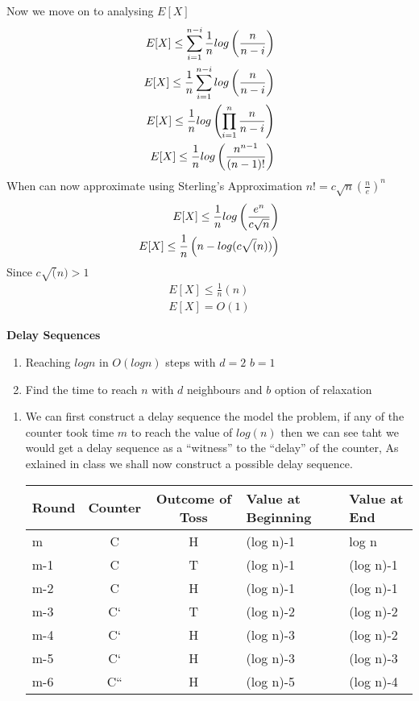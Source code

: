 \documentclass{assignment}
\begin{document}
\begin{problemlist}
\begin{problem}
\begin{answer}
Now we move on to analysing $E[X]$
\begin{eqnarray}
E[X] \leq \sum_{i=1}^{n-i} \frac{1}{n} log \left( {n \over n-i} \right)\\
E[X] \leq \frac{1}{n} \sum_{i=1}^{n-i} log \left( {n \over n-i} \right) \\
E[X] \leq \frac{1}{n} log  \left( \prod_{i=1}^{n} {n \over n-i} \right) \\
E[X] \leq \frac{1}{n} log  \left(  {n^{n-1} \over (n-1)!} \right) 
\end{eqnarray}
When can now approximate using Sterling's Approximation $n!= c \sqrt{n} \left(\frac{n}{e}\right)^n$ 
\begin{eqnarray}
E[X] \leq \frac{1}{n} log \left( e^n \over c\sqrt{n} \right)  \\
E[X] \leq \frac{1}{n} \left(n - log (c \sqrt(n))\right) 
\end{eqnarray}
Since $c \sqrt(n) > 1$
\begin{eqnarray}
E[X] \leq \frac{1}{n} \left(n \right) \\
E[X] = O(1)
\end{eqnarray}

\end{answer}

\end{problem}

\pbitem
\begin{problem}
\textbf{Delay Sequences} \\
\begin{enumerate}
\item Reaching $log n$ in $O(log n)$ steps with $d=2$ $b=1$
\item Find the time to reach $n$ with $d$ neighbours and $b$ option of relaxation
\end{enumerate}
\begin{answer}
\begin{enumerate}
 \item We can first construct a delay sequence the model the problem, if any of the counter took time $m$ to reach the value of $log(n)$ then we can see taht we would get a delay sequence as a ``witness'' to the ``delay'' of the counter, As exlained in class we shall now construct a possible delay sequence. 
\begin{center}
\begin{tabular}{l|c|c|l|l}
Round & Counter & Outcome of Toss & Value at Beginning & Value at End\\
\hline
m & C & H & (log n)-1 & log n\\
m-1 & C & T & (log n)-1 & (log n)-1\\
m-2 & C & H & (log n)-1 & (log n)-1 \\
m-3 & C`& T & (log n)-2 & (log n)-2 \\
m-4 & C`& H & (log n)-3 & (log n)-2 \\
m-5 & C`& H & (log n)-3 & (log n)-3 \\
m-6 & C``& H & (log n)-5 & (log n)-4 
\end{tabular}
\end{center}


\end{enumerate}
\end{answer}
\end{problem}
\end{problemlist}
\end{document}
